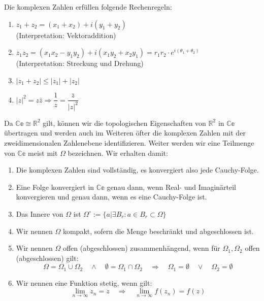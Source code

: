 \documentclass[a4paper, 12pt]{article}          %
\theoremstyle{break}
\theoremstyle{nonumberbreak}
\theoremstyle{break}
\theoremstyle{nonumberbreak}
\newcommand{\R}{\mathbb{R}}
\newcommand{\C}{\mathbb{Ce}}
\begin{document}
    \begin{proposition}
        Die komplexen Zahlen erfüllen folgende Rechenregeln:
        \begin{enumerate}
            \item $z_1+z_2 = (x_1+x_2)+i(y_1+y_2)$ \\(Interpretation: Vektoraddition)
            \item $z_{1}z_2 = (x_1x_2-y_1y_2)+i(x_1y_2+x_2y_1)=r_{1}r_2\cdot e^{i(\theta_1 +\theta_2)}$
            \\(Interpretation: Streckung und Drehung)
            \item $|z_1+z_2|\leq |z_1|+|z_2|$
            \item $|z|^2=z\bar{z}\Rightarrow \dfrac{1}{z} = \dfrac{\bar{z}}{|z|^2}$
        \end{enumerate}
    \end{proposition}

    \begin{definition}
        Da $\C\cong\R^2$ gilt, können wir die topologischen Eigenschaften von $\R^2$ in $\C$ übertragen
        und werden auch im Weiteren öfter die komplexen Zahlen mit der zweidimensionalen Zahlenebene
        identifizieren. Weiter werden wir eine Teilmenge von $\C$ meist mit $\Omega$ bezeichnen.
        Wir erhalten damit:
        \begin{enumerate}
            \item Die komplexen Zahlen sind vollständig, es konvergiert also jede Cauchy-Folge.
            \item Eine Folge konvergiert in $\C$ genau dann, wenn Real- und Imaginärteil konvergieren und genau
            dann, wenn es eine Cauchy-Folge ist.
            \item Das Innere von $\Omega$ ist $\Omega^\circ := \{a|\exists B_r: a\in B_r\subset \Omega\}$
            \item Wir nennen $\Omega$ kompakt, sofern die Menge beschränkt und abgeschlossen ist.
            \item Wir nennen $\Omega$ offen (abgeschlossen) zusammenhängend, wenn für $\Omega_1,\Omega_2$ offen
            (abgeschlossen) gilt:
            $$\Omega =\Omega_1\cup\Omega_2\quad\land\quad \emptyset = \Omega_1\cap \Omega_2\quad\Rightarrow
            \quad \Omega_1 = \emptyset\quad\lor \quad \Omega_2=\emptyset$$
            \item Wir nennen eine Funktion stetig, wenn gilt:
            $$\lim_{n\to \infty} z_n = z\quad \Rightarrow \quad \lim_{n\to \infty} f(z_n) = f(z)$$
        \end{enumerate}
    \end{definition}
\end{document}
